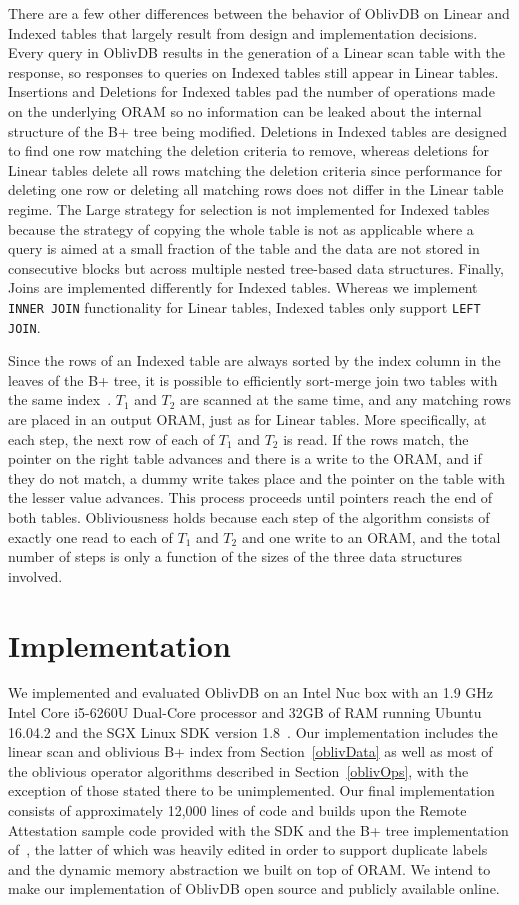 \documentclass[letterpaper,twocolumn,10pt]{article}
\def\name/{OblivDB}
\begin{document}
There are a few other differences between the behavior of \name/ on Linear and Indexed tables that largely result from design and implementation decisions. Every query in \name/ results in the generation of a Linear scan table with the response, so responses to queries on Indexed tables still appear in Linear tables. Insertions and Deletions for Indexed tables pad the number of operations made on the underlying ORAM so no information can be leaked about the internal structure of the B+ tree being modified. Deletions in Indexed tables are designed to find one row matching the deletion criteria to remove, whereas deletions for Linear tables delete all rows matching the deletion criteria since performance for deleting one row or deleting all matching rows does not differ in the Linear table regime. The Large strategy for selection is not implemented for Indexed tables because the strategy of copying the whole table is not as applicable where a query is aimed at a small fraction of the table and the data are not stored in consecutive blocks but across multiple nested tree-based data structures. Finally, Joins are implemented differently for Indexed tables. Whereas we implement \texttt{INNER JOIN} functionality for Linear tables, Indexed tables only support \texttt{LEFT JOIN}. 

Since the rows of an Indexed table are always sorted by the index column in the leaves of the B+ tree, it is possible to efficiently sort-merge join two tables with the same index~\cite{EN10}. $T_1$ and $T_2$ are scanned at the same time, and any matching rows are placed in an output ORAM, just as for Linear tables. More specifically, at each step, the next row of each of $T_1$ and $T_2$ is read. If the rows match, the pointer on the right table advances and there is a write to the ORAM, and if they do not match, a dummy write takes place and the pointer on the table with the lesser value advances. This process proceeds until pointers reach the end of both tables. Obliviousness holds because each step of the algorithm consists of exactly one read to each of $T_1$ and $T_2$ and one write to an ORAM, and the total number of steps is only a function of the sizes of the three data structures involved.  

\section{Implementation}\label{imp}
We implemented and evaluated \name/ on an Intel Nuc box with an 1.9 GHz Intel Core i5-6260U Dual-Core processor and 32GB of RAM running Ubuntu 16.04.2 and the SGX Linux SDK version 1.8~\cite{SGXRef}. Our implementation includes the linear scan and oblivious B+ index from Section~\ref{oblivData} as well as most of the oblivious operator algorithms described in Section~\ref{oblivOps}, with the exception of those stated there to be unimplemented. Our final implementation consists of approximately 12,000 lines of code and builds upon the Remote Attestation sample code provided with the SDK and the B+ tree implementation of~\cite{BPlus}, the latter of which was heavily edited in order to support duplicate labels and the dynamic memory abstraction we built on top of ORAM. We intend to make our implementation of \name/ open source and publicly available online.
\end{document}
